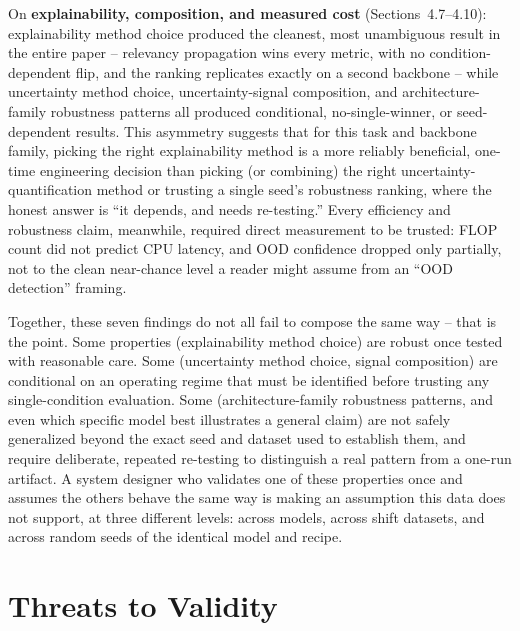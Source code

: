 \documentclass[runningheads]{llncs}
\begin{document}
On \textbf{explainability, composition, and measured cost}
(Sections~4.7--4.10): explainability method choice produced the cleanest,
most unambiguous result in the entire paper -- relevancy propagation wins
every metric, with no condition-dependent flip, and the ranking
replicates exactly on a second backbone -- while uncertainty method
choice, uncertainty-signal composition, and architecture-family robustness
patterns all produced conditional, no-single-winner, or seed-dependent
results. This asymmetry suggests that for this task and backbone family,
picking the right explainability method is a more reliably beneficial,
one-time engineering decision than picking (or combining) the right
uncertainty-quantification method or trusting a single seed's robustness
ranking, where the honest answer is ``it depends, and needs re-testing.''
Every efficiency and robustness claim, meanwhile, required direct
measurement to be trusted: FLOP count did not predict CPU latency, and
OOD confidence dropped only partially, not to the clean near-chance level
a reader might assume from an ``OOD detection'' framing.

Together, these seven findings do not all fail to compose the same way --
that is the point. Some properties (explainability method choice) are
robust once tested with reasonable care. Some (uncertainty method choice,
signal composition) are conditional on an operating regime that must be
identified before trusting any single-condition evaluation. Some
(architecture-family robustness patterns, and even which specific model
best illustrates a general claim) are not safely generalized beyond the
exact seed and dataset used to establish them, and require deliberate,
repeated re-testing to distinguish a real pattern from a one-run
artifact. A system designer who validates one of these properties once
and assumes the others behave the same way is making an assumption this
data does not support, at three different levels: across models, across
shift datasets, and across random seeds of the identical model and
recipe.

\section{Threats to Validity}
\end{document}
